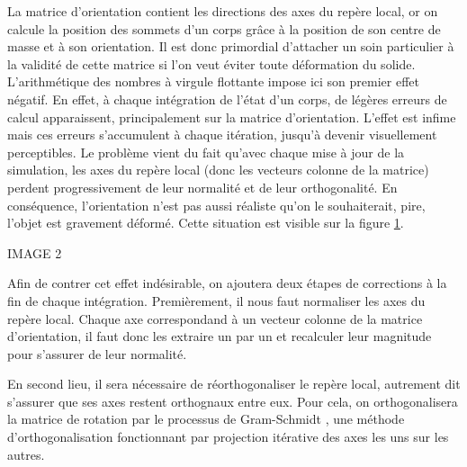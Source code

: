 La matrice d'orientation contient les directions des axes du repère
local, or on calcule la position des sommets d'un corps grâce à la
position de son centre de masse et à son orientation. Il est donc
primordial d'attacher un soin particulier à la validité de cette
matrice si l'on veut éviter toute déformation du
solide. L'arithmétique des nombres à virgule flottante impose ici son
premier effet négatif. En effet, à chaque intégration de l'état d'un
corps, de légères erreurs de calcul apparaissent, principalement sur
la matrice d'orientation. L'effet est infime mais ces erreurs
s'accumulent à chaque itération, jusqu'à devenir visuellement
perceptibles. Le problème vient du fait qu'avec chaque mise à jour de
la simulation, les axes du repère local (donc les vecteurs colonne de
la matrice) perdent progressivement de leur normalité et de leur
orthogonalité. En conséquence, l'orientation n'est pas aussi réaliste
qu'on le souhaiterait, pire, l'objet est gravement déformé. Cette
situation est visible sur la figure \ref{grahm}.

IMAGE 2
\begin{figure}
  \centering
  \caption{}
  \label{grahm}
\end{figure}

Afin de contrer cet effet indésirable, on ajoutera deux étapes de
corrections à la fin de chaque intégration. Premièrement, il nous faut
normaliser les axes du repère local. Chaque axe correspondand à un
vecteur colonne de la matrice d'orientation, il faut donc les extraire
un par un et recalculer leur magnitude pour s'assurer de leur
normalité.

En second lieu, il sera nécessaire de réorthogonaliser le repère
local, autrement dit s'assurer que ses axes restent orthognaux entre
eux. Pour cela, on orthogonalisera la matrice de rotation par
le processus de Gram-Schmidt \cite{weber}, une méthode
d'orthogonalisation fonctionnant par projection itérative des axes les
uns sur les autres. 

